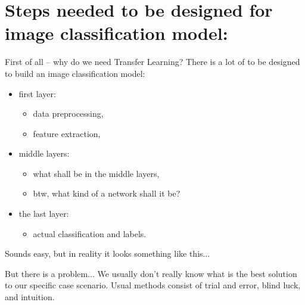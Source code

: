 \documentclass[aspectratio=1610,english]{beamer} %
\begin{document}
	\section{Steps needed to be designed for image classification model:}
	\begin{frame}{First of all -- why do we need Transfer Learning?}
		There is a lot of to be designed to build an image classification model:
		\begin{itemize}
			\item first layer:
			\begin{itemize}
				\item data preprocessing,
				\item feature extraction,
			\end{itemize}

		\item middle layers:
			\begin{itemize}
				\item what shall be in the middle layers,
				\item btw, what kind of a network shall it be?
			\end{itemize}
		
		\item the last layer:
			\begin{itemize}
				\item actual classification and labels.
			\end{itemize}
		\end{itemize}
	 \end{frame}
 
 	\begin{frame}{Sounds easy, but in reality it looks something like this...}
		\begin{center}
		\end{center}
	\end{frame}
 
	\begin{frame}{But there is a problem...}
		We usually don't really know what is the best solution to our specific case scenario.
		\newline
		\newline
		Usual methods consist of trial and error, blind luck, and intuition.
	
	 \end{frame}
 
\end{document}
